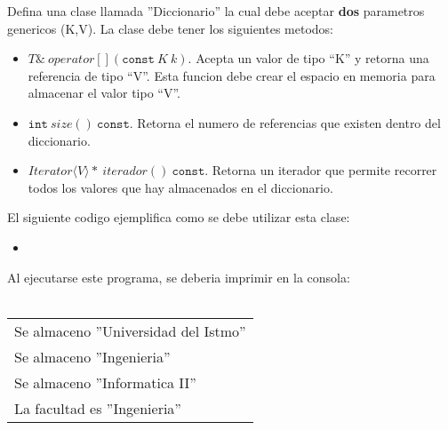 \documentclass{article}
\newcommand{\perlscript}[2]{
\begin{itemize}
\item[]
\end{itemize}
}
\begin{document}
Defina una clase llamada ''Diccionario'' la cual debe aceptar {\bf dos} parametros genericos (K,V).
La clase debe tener los siguientes metodos:
\begin{itemize}
        \item{$T\&\ operator[](\mathtt{const}\ K\ k)$. Acepta un valor de tipo ``K'' y retorna
        una referencia de tipo ``V''. Esta funcion debe crear el espacio en memoria para almacenar
        el valor tipo ``V''.}
        \item{$\mathtt{int}\ size()\ \mathtt{const}$. Retorna el numero de referencias que
        existen dentro del diccionario.}
        \item{$Iterator\langle V\rangle*\ iterador()\ \mathtt{const}$. Retorna un iterador que permite
        recorrer todos los valores que hay almacenados en el diccionario.}
\end{itemize}
El siguiente codigo ejemplifica como se debe utilizar esta clase:
\perlscript{dict.cc}{}
Al ejecutarse este programa, se deberia imprimir en la consola:
\\\\
\begin{center}
\begin{tabular}{|l|}
        \hline
        Se almaceno ''Universidad del Istmo'' \\
        Se almaceno ''Ingenieria'' \\
        Se almaceno ''Informatica II'' \\
        La facultad es ''Ingenieria'' \\
        \hline
\end{tabular}
\end{center}
\end{document}
